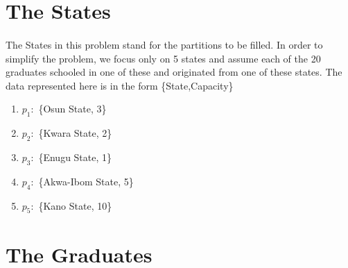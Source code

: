\documentclass[a4paper,openany]{book}
\begin{document}
		\section{The States}
			\paragraph{}
				The States in this problem stand for the partitions to be filled. In order to simplify the problem, we focus only on 5 states and assume each of the 20 graduates schooled in one of these and originated from one of these states. The data represented here is in the form \{State,Capacity\}
				\begin{enumerate}
					\item $p_1\colon$ \{Osun State, 3\}
					\item $p_2\colon$ \{Kwara State, 2\}
					\item $p_3\colon$ \{Enugu State, 1\}
					\item $p_4\colon$ \{Akwa-Ibom State, 5\}
					\item $p_5\colon$ \{Kano State, 10\}
				\end{enumerate}
		\section{The Graduates}
\end{document}
